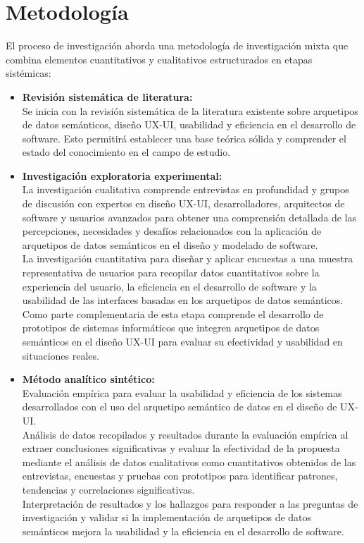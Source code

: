 \documentclass[12pt,a4paper]{article}
\begin{document}
\section{Metodología}
\label{sec:11}
El proceso de investigación aborda una metodología de investigación mixta que combina elementos cuantitativos y cualitativos estructurados en etapas sistémicas:
\begin{itemize}
  \item \textbf{ Revisión sistemática de literatura: }\\
   Se inicia con la revisión sistemática de la literatura existente sobre arquetipos de datos semánticos, diseño UX-UI, usabilidad y eficiencia en el desarrollo de software. Esto permitirá establecer una base teórica sólida y comprender el estado del conocimiento en el campo de estudio. 
   \item \textbf{ Investigación exploratoria experimental: }\\
   La investigación cualitativa comprende entrevistas en profundidad y grupos de discusión con expertos en diseño UX-UI, desarrolladores, arquitectos de software y usuarios avanzados para obtener una comprensión detallada de las percepciones, necesidades y desafíos relacionados con la aplicación de arquetipos de datos semánticos en el diseño y modelado de software. 
   \\
   La investigación cuantitativa para diseñar y aplicar encuestas a una muestra representativa de usuarios para recopilar datos cuantitativos sobre la experiencia del usuario, la eficiencia en el desarrollo de software y la usabilidad de las interfaces basadas en los arquetipos de datos semánticos. 
   \\
   Como parte complementaria de esta etapa comprende el desarrollo de prototipos de sistemas informáticos que integren arquetipos de datos semánticos en el diseño UX-UI para evaluar su efectividad y usabilidad en situaciones reales. 
   \item \textbf{Método analítico sintético:}\\
   Evaluación empírica para evaluar la usabilidad y eficiencia de los sistemas desarrollados con el uso del arquetipo semántico de datos en el diseño de UX-UI. 
   \\
   Análisis de datos recopilados y resultados durante la evaluación empírica al extraer conclusiones significativas y evaluar la efectividad de la propuesta mediante el análisis de datos cualitativos como cuantitativos obtenidos de las entrevistas, encuestas y pruebas con prototipos para identificar patrones, tendencias y correlaciones significativas. 
  \\
   Interpretación de resultados y los hallazgos para responder a las preguntas de investigación y validar si la implementación de arquetipos de datos semánticos mejora la usabilidad y la eficiencia en el desarrollo de software.
\end{itemize}
\end{document}
